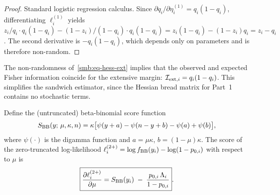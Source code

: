 \begin{proof}
  Standard logistic regression calculus.  Since
  $\partial q_i/\partial\eta_i^{(1)} = q_i(1-q_i)$,
  differentiating $\ell_i^{(1)}$ yields
  $z_i/q_i \cdot q_i(1-q_i) - (1-z_i)/(1-q_i) \cdot q_i(1-q_i)
  = z_i(1-q_i) - (1-z_i)q_i = z_i - q_i$.
  The second derivative is $-q_i(1-q_i)$, which depends only on
  parameters and is therefore non-random.
\end{proof}

\begin{remark}\label{smb:rem-ext-info}
  The non-randomness of~\eqref{smb:eq-hess-ext} implies that the
  observed and expected Fisher information coincide for the extensive
  margin:
  $\mathcal{I}_{\textup{ext},i} = q_i(1-q_i)$.
  This simplifies the sandwich estimator, since the Hessian bread matrix
  for Part~1 contains no stochastic terms.
\end{remark}


\begin{proposition}
\label{smb:prop-score-mu}
  Define the (untruncated) beta-binomial score function
  \citep[following the parameterization of][]{Prentice1986}
  \begin{equation}\label{smb:eq-Sbb}
    S_{\textup{BB}}(y;\, \mu,\kappa,n)
    = \kappa\bigl[\psi(y+a) - \psi(n-y+b) - \psi(a) + \psi(b)\bigr],
  \end{equation}
  where $\psi(\cdot)$ is the digamma function and $a = \mu\kappa$,
  $b = (1-\mu)\kappa$.  The score of the zero-truncated
  log-likelihood\/ $\ell_i^{(2+)} = \log f_{\textup{BB}}(y_i)
  - \log(1-p_{0,i})$ with respect to $\mu$ is
  \begin{equation}\label{smb:eq-score-mu}
    \boxed{%
      \frac{\partial\ell_i^{(2+)}}{\partial\mu}
      = S_{\textup{BB}}(y_i)
        \;-\; \frac{p_{0,i}\,\Lambda_i}{1-p_{0,i}}
    }.
  \end{equation}
\end{proposition}


